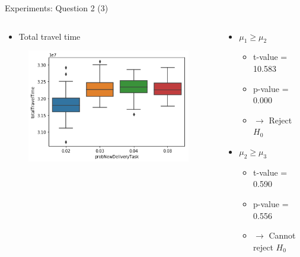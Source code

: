 \begin{frame}{Experiments: Question 2 (3)}
    \begin{columns}

        \begin{column}{0.5\textwidth}
            \begin{itemize}
                \item Total travel time
            \end{itemize}

            \begin{figure}[hbt]
                \includegraphics[width=1.1\textwidth]{imgs/question2-plot2}
            \end{figure}
        \end{column}

        \begin{column}{0.5\textwidth}
            \begin{itemize}
                \item $\mu_1 \geq \mu_2$
                    \begin{itemize}
                        \item t-value = 10.583
                        \item p-value = 0.000
                        \item $\rightarrow$ Reject $H_0$
                    \end{itemize}

                \item $\mu_2 \geq \mu_3$
                    \begin{itemize}
                        \item t-value = 0.590
                        \item p-value = 0.556
                        \item $\rightarrow$ Cannot reject $H_0$
                    \end{itemize}


\end{itemize}
\end{column}
\end{columns}
\end{frame}
